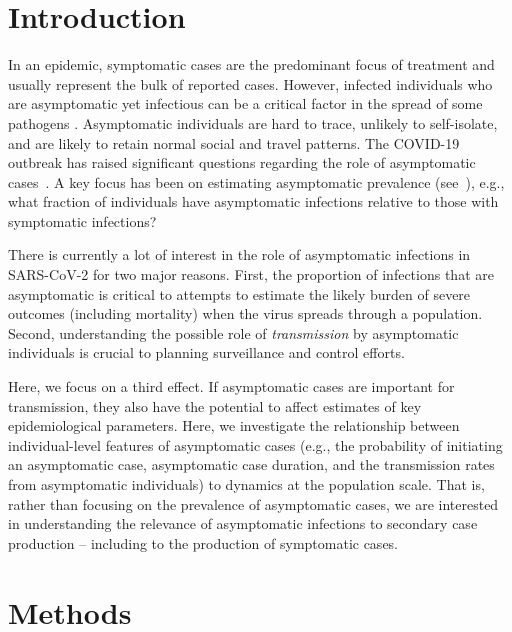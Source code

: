 \section{Introduction}

In an epidemic, symptomatic cases are the predominant focus of treatment and usually represent the bulk of reported cases. 
However, infected individuals who are asymptomatic yet infectious can be a critical factor in the spread of some pathogens \citep{fraser2004factors}.
Asymptomatic individuals are hard to trace, unlikely to self-isolate, and are likely to retain normal social and travel patterns.
The COVID-19 outbreak has raised significant
questions regarding the role of asymptomatic cases~\citep{fauci_nejm2020}.
A key focus has been on estimating asymptomatic prevalence (see~\citep{mizumoto_2020}), e.g., what fraction of individuals have asymptomatic infections relative to those with symptomatic infections?

There is currently a lot of interest in the role of asymptomatic infections in SARS-CoV-2 for two major reasons. 
First, the proportion of infections that are asymptomatic is critical to attempts to estimate the likely burden of severe outcomes (including mortality) when the virus spreads through a population.
Second, understanding the possible role of \emph{transmission} by asymptomatic individuals is crucial to planning surveillance and control efforts.

Here, we focus on a third effect. 
If asymptomatic cases are important for transmission, they also have the potential to affect estimates of key epidemiological parameters. 
Here, we investigate the relationship between individual-level features of asymptomatic cases (e.g., the probability of initiating an asymptomatic case, asymptomatic case duration, and the transmission rates from asymptomatic individuals) to dynamics at the population scale. 
That is, rather than focusing on the prevalence
of asymptomatic cases, we are interested in understanding the
relevance of asymptomatic infections to secondary case production -- including
to the production of symptomatic cases.

\section{Methods}

